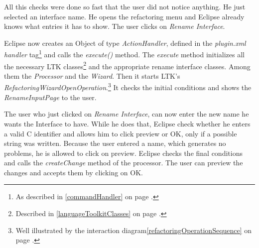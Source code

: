 \documentclass[a4paper,10pt]{report}
\begin{document}
All this checks were done so fast that the user did not notice anything. He just selected an interface name.
He opens the refactoring menu and Eclipse already knows what entries it has to show. The user clicks on {\it Rename Interface}.

Eclipse now creates an Object of type {\it ActionHandler}, defined in the {\it plugin.xml} {\it handler} tag\footnote{As described in \ref{commandHandler} on page \pageref{commandHandler}.} and calls the {\it execute()} method. 
The {\it execute} method initializes all the necessary LTK classes\footnote{Described in \ref{languageToolkitClasses} on page \pageref{languageToolkitClasses}.} 
and the appropriate rename interface classes. Among them the {\it Processor} and the {\it Wizard}.
Then it starts LTK's {\it RefactoringWizardOpenOperation}.\footnote{Well illustrated by the interaction diagram\ref{refactoringOperationSequence} on page \pageref{refactoringOperationSequence}.}
It checks the initial conditions and shows the {\it RenameInputPage} to the user.

The user who just clicked on {\it Rename Interface}, can now enter the new name he wants the Interface to have.
While he does that, Eclipse check whether he enters a valid C identifier and allows him to click preview or OK, only if a possible string was written.
Because the user entered a name, which generates no problems, he is allowed to click on preview.
Eclipse checks the final conditions and calls the {\it createChange} method of the processor.
The user can preview the changes and accepts them by clicking on OK.
\end{document}
